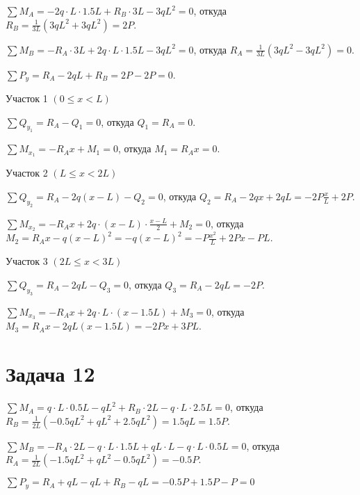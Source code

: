 $ \sum M_A = -2q \cdot L \cdot 1.5L + R_B \cdot 3L - 3qL^2 = 0 $,
откуда $ R_B = \frac{1}{3L}\left(3qL^2 + 3qL^2\right) = 2P $.

$ \sum M_B = -R_A \cdot 3L + 2q \cdot L \cdot 1.5L - 3qL^2 = 0 $,
откуда $ R_A = \frac{1}{3L}\left(3qL^2 - 3qL^2\right) = 0 $.

$ \sum P_y = R_A - 2qL + R_B = 2P - 2P = 0 $.

\vspace{1.5ex}

Участок 1 $ \left(0 \le x < L\right) $

$ \sum Q_{y_1} = R_A - Q_1 = 0 $,
откуда $ Q_1 = R_A = 0 $.

$ \sum M_{x_1} = -R_A x + M_1 = 0 $,
откуда $ M_1 = R_A x = 0 $.

\vspace{1.5ex}

Участок 2 $ \left(L \le x < 2L\right) $

$ \sum Q_{y_2} = R_A - 2q(x - L) - Q_2 = 0 $,
откуда $ Q_2 = R_A - 2qx + 2qL = -2P\frac{x}{L} + 2P $.

$ \sum M_{x_2} = -R_A x + 2q \cdot (x - L) \cdot \frac{x-L}{2} + M_2 = 0 $,
откуда $ M_2 = R_A x - q(x - L)^2 = -q(x - L)^2 = -P\frac{x^2}{L} + 2Px - PL $.

\vspace{1.5ex}

Участок 3 $ \left(2L \le x < 3L\right) $

$ \sum Q_{y_3} = R_A - 2qL - Q_3 = 0 $,
откуда $ Q_3 = R_A - 2qL = -2P $.

$ \sum M_{x_3} = -R_A x + 2q \cdot L \cdot (x-1.5L) + M_3 = 0 $,
откуда $ M_3 = R_A x - 2qL(x - 1.5L) = -2Px + 3PL $.


\section{Задача 12}

$ \sum M_A = q \cdot L \cdot 0.5L - qL^2 + R_B \cdot 2L - q \cdot L \cdot 2.5L = 0 $,
откуда $ R_B = \frac{1}{2L}\left(-0.5qL^2 + qL^2 + 2.5qL^2\right) = 1.5qL = 1.5P $.

$ \sum M_B = -R_A \cdot 2L - q \cdot L \cdot 1.5L + qL \cdot L - q \cdot L \cdot 0.5L = 0 $,
откуда $ R_A = \frac{1}{2L}\left(-1.5qL^2 + qL^2 - 0.5qL^2\right) = -0.5P $.

$ \sum P_y = R_A + qL - qL + R_B - qL = -0.5P + 1.5P - P = 0 $

\vspace{1.5ex}

